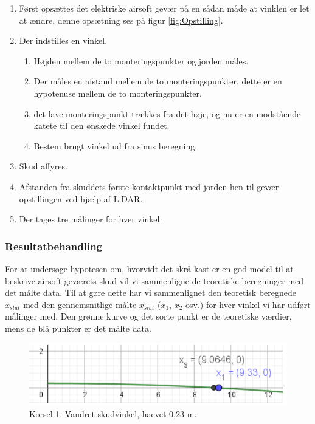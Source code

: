 \begin{enumerate}
\item Først opsættes det elektriske airsoft gevær på en sådan måde at vinklen er let at ændre, denne opsætning ses på figur \ref{fig:Opstilling}.

\item Der indstilles en vinkel. 
\begin{enumerate}
\item Højden mellem de to monteringspunkter og jorden måles.
\item Der måles en afstand mellem de to monteringspunkter, dette er en hypotenuse mellem de to monteringspunkter.
\item det lave monteringspunkt trækkes fra det høje, og nu er en modstående katete til den ønskede vinkel fundet.
\item Bestem brugt vinkel ud fra sinus beregning.
\end{enumerate}

\item Skud affyres.

\item Afstanden fra skuddets første kontaktpunkt med jorden hen til gevær-opstillingen ved hjælp af LiDAR.

\item Der tages tre målinger for hver vinkel.
\end{enumerate}

\subsubsection{Resultatbehandling}

For at undersøge hypotesen om, hvorvidt det skrå kast er en god model til at beskrive airsoft-geværets skud vil vi sammenligne de teoretiske beregninger med det målte data. Til at gøre dette har vi sammenlignet den teoretisk beregnede $x_{slut}$ med den gennemsnitlige målte $x_{slut}$ ($x_{1}$, $x_{2}$ osv.) for hver vinkel vi har udført målinger med. Den grønne kurve og det sorte punkt er de teoretiske værdier, mens de blå punkter er det målte data.

\begin{figure}[H]
\centering
\includegraphics[scale=0.7]{Billeder/Resultatbehandling1.png}
\caption{Korsel 1. Vandret skudvinkel, haevet 0,23 m.}
\label{fig:Resultatbehandling1}
\end{figure}

